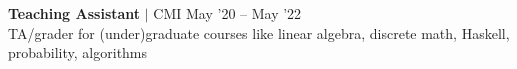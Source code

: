 


\resumeProjectHeading
{\textbf{Teaching Assistant} $|$ CMI}
{May '20 -- May '22}\\
\vspace{4pt}
{\color{gray}TA/grader for (under)graduate courses like linear algebra, discrete math, Haskell, probability, algorithms}
\vspace{-15pt}





%

\resumeSubHeadingListEnd


















